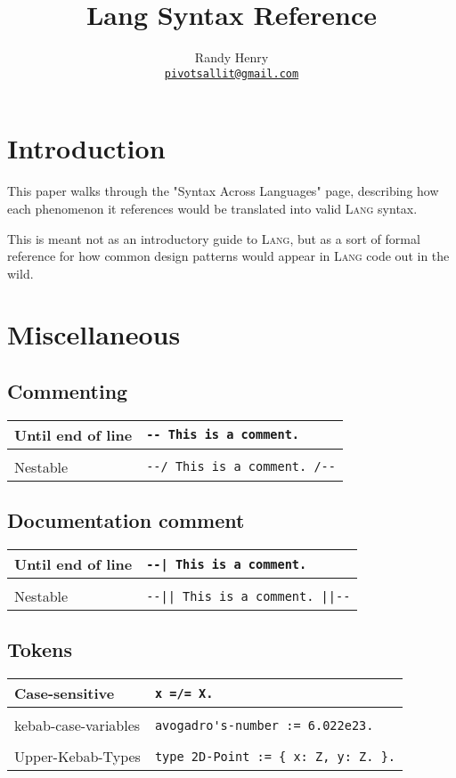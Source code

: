 \documentclass[a4paper,12pt]{article}
\author{
        Randy Henry \\ 
        \href{mailto:pivotsallit@gmail.com}
        {{\small \texttt{pivotsallit@gmail.com}}}}
\title{Lang Syntax Reference}
\makeatletter
\newcommand{\code}{\lstinline}
\newcommand{\br}{\\ [0.5em] \hline \\ [-0.5em]}
\newenvironment{data}
    {
        \begin{center}
        \begin{tabular*}{\textwidth}{ l@{\extracolsep{\fill}}l }
    }
    {
        \end{tabular*}
        \end{center}
    }
\makeatother
\begin{document}
\maketitle
\tableofcontents

\newpage

\section{Introduction}
    This paper walks through the "Syntax Across Languages" \cite{SAL}
    page, describing how each phenomenon it references would be translated
    into valid \textsc{Lang} syntax.

    This is meant not as an introductory guide to \textsc{Lang}, but as a sort 
    of formal reference for how common design patterns would appear 
    in \textsc{Lang} code out in the wild.


\section{Miscellaneous} 
\subsection{Commenting}
    \begin{data}
        Until end of line & 
            \code|-- This is a comment.| \br
        Nestable          & 
            \code$--/ This is a comment. /--$
    \end{data}

\subsection{Documentation comment}
    \begin{data}
        Until end of line & 
            \code$--| This is a comment.$ \br
        Nestable          & 
            \code$--|| This is a comment. ||--$
    \end{data}

\subsection{Tokens}
    \begin{data}
        Case-sensitive       & 
            \code|x =/= X.| \br
        kebab-case-variables & 
            \code|avogadro's-number := 6.022e23.| \br
        Upper-Kebab-Types    & 
            \code|type 2D-Point := { x: Z, y: Z. }.|
    \end{data}
    
\end{document}

